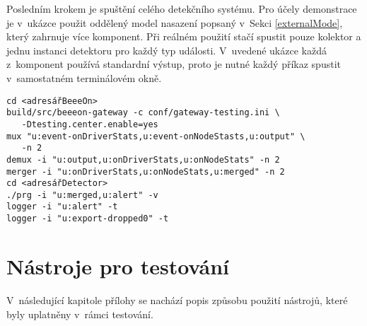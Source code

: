 \documentclass[thesis=M,czech]{FITthesis}[2012/06/26]
\begin{document}
\begin{enumerate}
Posledním krokem je spuštění celého detekčního systému. Pro účely demonstrace je
v~ukázce použit oddělený model nasazení popsaný v~Sekci \ref{externalMode}, který zahrnuje více komponent. Při reálném 
použití stačí spustit pouze kolektor a jednu instanci detektoru pro každý typ události. V~uvedené
ukázce každá z~komponent používá standardní výstup, proto je nutné každý příkaz spustit v~samostatném
terminálovém okně.
\begin{verbatim}
cd <adresářBeeeOn> 
build/src/beeeon-gateway -c conf/gateway-testing.ini \
   -Dtesting.center.enable=yes 
mux "u:event-onDriverStats,u:event-onNodeStasts,u:output" \
   -n 2
demux -i "u:output,u:onDriverStats,u:onNodeStats" -n 2
merger -i "u:onDriverStats,u:onNodeStats,u:merged" -n 2
cd <adresářDetector> 
./prg -i "u:merged,u:alert" -v
logger -i "u:alert" -t
logger -i "u:export-dropped0" -t
\end{verbatim}
\end{enumerate}


\chapter{Nástroje pro testování}
V~následující kapitole přílohy se nachází popis způsobu použití nástrojů, které byly uplatněny 
v~rámci testování.
\end{document}
